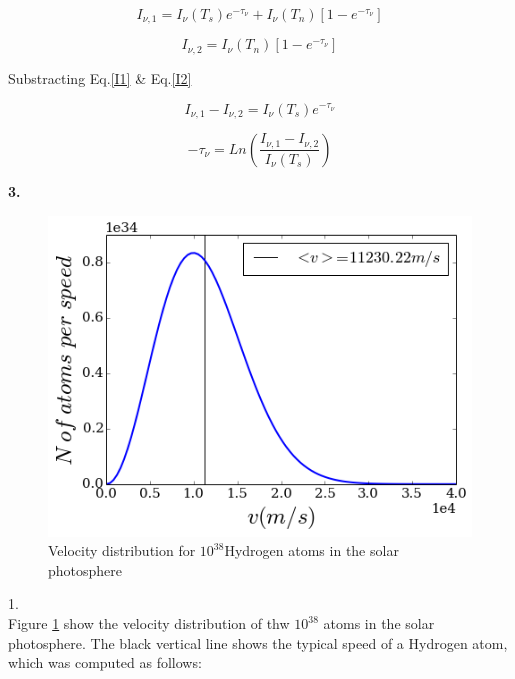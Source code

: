 \documentclass[12pt]{article}
\begin{document}
\begin{equation}\label{I1}
I_{\nu, 1 } = I_{\nu}(T_s)e^{-\tau_{\nu}} + I_{\nu}(T_n)\left[ 1 - e^{-\tau_{\nu}} \right]
\end{equation}

\begin{equation}\label{I2}
I_{\nu, 2} = I_{\nu}(T_n)\left[ 1 - e^{-\tau_{\nu}} \right]
\end{equation}

Substracting Eq.\ref{I1} \& Eq.\ref{I2}

\begin{equation}
I_{\nu, 1} - I_{\nu, 2} = I_{\nu}(T_s)e^{-\tau_{\nu}}
\end{equation}



\begin{equation}
-\tau_{\nu} = Ln \left( \dfrac{I_{\nu, 1} - I_{\nu, 2}}{I_{\nu}(T_s)}  \right)
\end{equation}

\begin{LARGE}
\textbf{3.}
\end{LARGE}

\begin{figure}[H]
\includegraphics[scale=0.5]{mbv.png}
\caption{Velocity distribution for $10^{38}$Hydrogen atoms 
in the solar photosphere\label{mbv}}
\end{figure}

1. \\
Figure \ref{mbv} show the velocity distribution of thw $10^{38}$ atoms
in the solar photosphere. The black vertical line shows the typical
speed of a Hydrogen atom, which was computed as follows:
\end{document}
